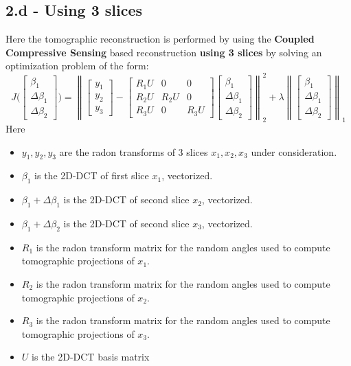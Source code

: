 \documentclass[12pt]{article}
\newcommand{\norm}[1]{\left\lVert #1 \right\rVert}
\begin{document}
\subsection*{2.d - Using 3 slices}
Here the tomographic reconstruction is performed by using the \textbf{Coupled Compressive Sensing} based reconstruction \textbf{using 3 slices} by solving an optimization problem of the form:
$$J\bigg(\begin{bmatrix}
\beta_1 \\ \Delta \beta_1 \\ \Delta \beta_2
\end{bmatrix}\bigg) = \norm{\begin{bmatrix}
	y_1\\y_2\\y_3
	\end{bmatrix} - \begin{bmatrix}
	R_1U & 0 & 0\\
	R_2U & R_2U & 0\\
	R_3U & 0 & R_3U
	\end{bmatrix} \begin{bmatrix}
	\beta_1 \\ \Delta \beta_1\\ \Delta \beta_2
	\end{bmatrix}}_2^2 + \lambda \norm{\begin{bmatrix}
	\beta_1 \\ \Delta \beta_1\\ \Delta \beta_2
	\end{bmatrix}}_1$$
Here 
\begin{itemize}
	\item  $y_1, y_2, y_3$ are the radon transforms of 3 slices $x_1, x_2, x_3$ under consideration.
	\item $\beta_1$ is the 2D-DCT of first slice $x_1$, vectorized.
	\item $\beta_1 + \Delta \beta_1$ is the 2D-DCT of second slice $x_2$, vectorized.
	\item $\beta_1 + \Delta \beta_2$ is the 2D-DCT of second slice $x_3$, vectorized.
	\item $R_1$ is the radon transform matrix for the random angles used to compute tomographic projections of $x_1$.
	\item $R_2$ is the radon transform matrix for the random angles used to compute tomographic projections of $x_2$.
	\item $R_3$ is the radon transform matrix for the random angles used to compute tomographic projections of $x_3$.
	\item $U$ is the 2D-DCT basis matrix
\end{itemize}
\end{document}

